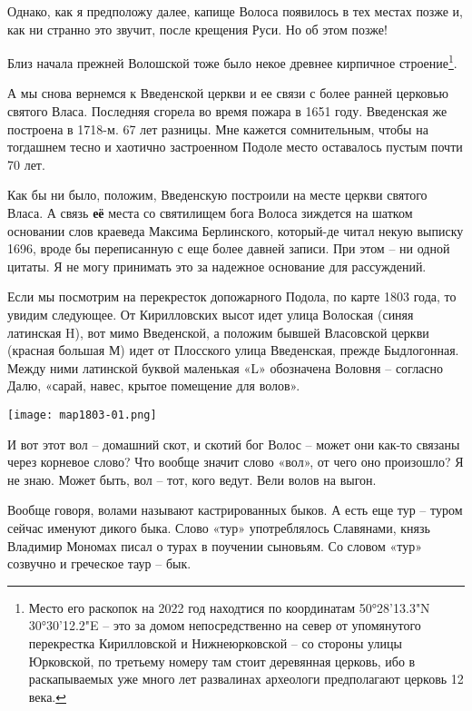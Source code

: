 \documentclass[a5paper,11pt,openany]{article}
\begin{document}
   Однако, как я предположу далее, капище Волоса появилось в тех местах позже и, как ни странно это звучит, после крещения Руси. Но об этом позже!

  Близ начала прежней Волошской тоже было некое древнее кирпичное строение\footnote{Место его раскопок на 2022 год находтися по координатам
50°28'13.3"N 30°30'12.2"E – это за домом непосредственно на север от упомянутого перекрестка Кирилловской и Нижнеюрковской – со стороны улицы Юрковской, по третьему номеру там стоит деревянная церковь, ибо в раскапываемых уже много лет развалинах археологи предполагают церковь 12 века.}. 

 А мы снова вернемся к Введенской церкви и ее связи с более ранней церковью святого Власа. Последняя сгорела во время пожара в 1651 году. Введенская же построена в 1718-м. 67 лет разницы. Мне кажется сомнительным, чтобы на тогдашнем тесно и хаотично застроенном Подоле место оставалось пустым почти 70 лет. 

 Как бы ни было, положим, Введенскую построили на месте церкви святого Власа. А связь \textbf{её} места со святилищем бога Волоса зиждется на шатком основании слов краеведа Максима Берлинского, который-де читал некую выписку 1696, вроде бы переписанную с еще более давней записи. При этом – ни одной цитаты. Я не могу принимать это за надежное основание для рассуждений.

Если мы посмотрим на перекресток допожарного Подола, по карте 1803 года, то увидим следующее. От Кирилловских высот идет улица Волоская (синяя латинская H), вот мимо Введенской, а положим бывшей Власовской церкви (красная большая М) идет от Плосского улица Введенская, прежде Быдлогонная. Между ними латинской буквой маленькая «L» обозначена Воловня – согласно Далю, «сарай, навес, крытое помещение для волов».

\begin{center}
\texttt{[image: map1803-01.png]}
\end{center}

    И вот этот вол – домашний скот, и скотий бог Волос – может они как-то связаны через корневое слово? Что вообще значит слово «вол», от чего оно произошло? Я не знаю. Может быть, вол – тот, кого ведут. Вели волов на выгон.

   Вообще говоря, волами называют кастрированных быков. А есть еще тур – туром сейчас именуют дикого быка. Слово «тур» употреблялось Славянами, князь Владимир Мономах писал о турах в поучении сыновьям. Со словом «тур» созвучно и греческое таур – бык.
\end{document}
